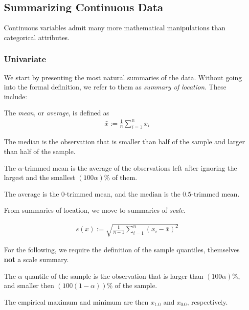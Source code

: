 \subsection{Summarizing  Continuous Data}
Continuous variables admit many more mathematical manipulations than categorical attributes. 


\subsubsection{Univariate}

We start by presenting the most natural summaries of the data. Without going into the formal definition, we refer to them as \emph{summary of location}.
These include:

\begin{definition}
The \emph{mean}, or \emph{average}, is defined as 
\begin{align}
	\bar{x}:= \frac{1}{n}\sum_{i=1}^{n} x_i
\end{align}
\end{definition}

\begin{definition}
The median is the observation that is smaller than half of the sample and larger than half of the sample.
\end{definition}

\begin{definition}
The $\alpha$-trimmed mean is the average of the observations left after ignoring the largest and the smallest $(100\alpha) \%$ of them.
\end{definition}
The \naive average is the $0$-trimmed mean, and the median is the $0.5$-trimmed mean.

From summaries of location, we move to summaries of \emph{scale}. 

\begin{definition}
\begin{align}
	s(x):= \sqrt{\frac{1}{n-1} \sum_{i=1}^{n} (x_i-\bar{x})^2}
\end{align}
\end{definition}

For the following, we require the definition of the sample quantiles, themselves \textbf{not} a scale summary.

\begin{definition}
The $\alpha$-quantile of the sample is the observation that is larger than $(100\alpha)\%$, and smaller then  $(100(1-\alpha))\%$ of the sample. 
\end{definition}
The empirical maximum and minimum are then $x_{1.0}$ and $x_{0.0}$, respectively.


